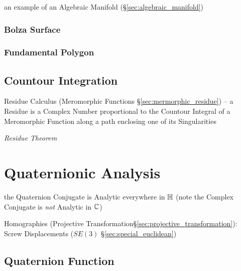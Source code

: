 an example of an Algebraic Manifold (\S\ref{sec:algebraic_manifold})



\subsubsection{Bolza Surface}\label{sec:bolza_surface}

\subsubsection{Fundamental Polygon}\label{sec:fundamental_polygon}



\subsection{Countour Integration}\label{sec:contour_integration}

Residue Calculus (Meromorphic Functions \S\ref{sec:mermorphic_residue}) -- a
Residue is a Complex Number proportional to the Countour Integral of a
Meromorphic Function along a path enclosing one of its Singularities

\emph{Residue Theorem}



\section{Quaternionic Analysis}\label{sec:quaternionic_analysis}

the Quaternion Conjugate is Analytic everywhere in $\mathbb{H}$
(note the Complex Conjugate is \emph{not} Analytic in $\mathbb{C}$)

Homographies (Projective Transformation\S\ref{sec:projective_transformation}):
Screw Displacements ($SE(3)$ \S\ref{sec:special_euclidean})



\subsection{Quaternion Function}\label{sec:quaternion_function}

